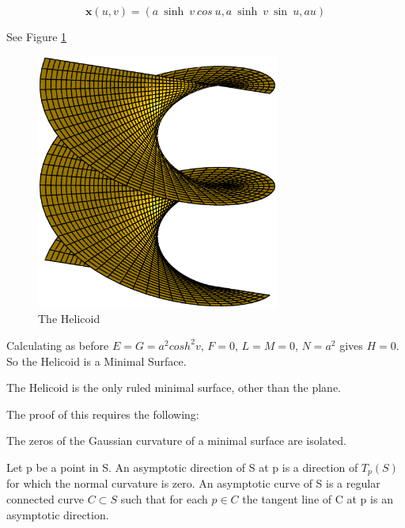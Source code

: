 \begin{example}
\begin{displaymath}
\mathbf x(u,v) = (a\:\sinh \: v\: cos \: u, a \: \sinh \:v \: \sin \:u, au)
\end{displaymath}

See Figure \ref{fig:helicoid}

\begin{figure}[htbp]
	\centering
       \includegraphics[width=8cm]{Images/Helicoid.eps}
   \caption{The Helicoid}
   \label{fig:helicoid}
\end{figure} 

Calculating as before $E=G= a^2cosh^2v$, $F = 0$, $L = M = 0$, $N = a^2$ gives $H=0$. So the Helicoid is a Minimal Surface.
\end{example}

\begin{theorem}
\label{Ruled}
The Helicoid is the only ruled minimal surface, other than the plane.
\label{RuledMinimal}
\end{theorem}
The proof of this requires the following:

\begin{lemma}
The zeros of the Gaussian curvature of a minimal surface are isolated.
\end{lemma}

\begin{definition}
Let p be a point in S. An asymptotic direction of S at p is a direction of $T_p(S)$ for which the normal curvature is zero. An asymptotic curve of S is a regular connected curve $C \subset S$ such that for each $p \in C$ the tangent line of C at p is an asymptotic direction.
\end{definition}

